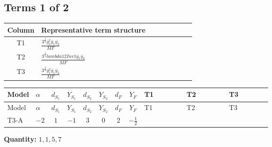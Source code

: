 \documentclass[8pt]{article}
\begin{document}
\begin{landscape}
\subsection*{Terms 1 of 2}
\begin{center}
\begin{tabular}{@{}c >{\raggedright\arraybackslash}p{0.82\linewidth}@{}}
\toprule
Column & Representative term structure \\
\midrule
T1 & \(\displaystyle \frac{3^{\frac{3}{4}} g_{2}^{2} \overline{y_{1}} \overline{y_{2}}}{MF}\) \\
\midrule
T2 & \(\displaystyle \frac{3^{\frac{3}{4}} lambda12Inv1 \overline{y_{1}} \overline{y_{2}}}{MF}\) \\
\midrule
T3 & \(\displaystyle \frac{3^{\frac{3}{4}} g_{1}^{2} \overline{y_{1}} \overline{y_{2}}}{MF}\) \\
\midrule
\bottomrule
\end{tabular}
\end{center}
\smallskip
\tiny
\begin{longtable}{@{}llcccccc >{\raggedright\arraybackslash}p{0.21\linewidth} >{\raggedright\arraybackslash}p{0.21\linewidth} >{\raggedright\arraybackslash}p{0.21\linewidth}@{}}
\toprule
Model & $\alpha$ & $d_{S_1}$ & $Y_{S_1}$ & $d_{S_2}$ & $Y_{S_2}$ & $d_F$ & $Y_F$ & T1 & T2 & T3 \\
\midrule
\endfirsthead
\toprule
Model & $\alpha$ & $d_{S_1}$ & $Y_{S_1}$ & $d_{S_2}$ & $Y_{S_2}$ & $d_F$ & $Y_F$ & T1 & T2 & T3 \\
\midrule
\endhead
T3-A & $-2$ & $1$ & $-1$ & $3$ & $0$ & $2$ & $-\frac{1}{2}$ & \scriptsize\adjustbox{max width=\linewidth}{$\begin{gathered} - \frac{11 \cdot 3^{\frac{3}{4}} g_{2}^{2} \overline{y_{1}} \overline{y_{2}}}{8 MF}\end{gathered}$} & \scriptsize\adjustbox{max width=\linewidth}{$\begin{gathered} - \frac{3^{\frac{3}{4}} lambda12Inv1 \overline{y_{1}} \overline{y_{2}}}{6 MF}\end{gathered}$} & \scriptsize\adjustbox{max width=\linewidth}{$\begin{gathered} - \frac{3^{\frac{3}{4}} g_{1}^{2} \overline{y_{1}} \overline{y_{2}}}{8 MF}\end{gathered}$} \\
\midrule
\bottomrule
\end{longtable}
\clearpage
\noindent\textbf{Quantity: }$\mathrm{1,1,5,7}$\par\smallskip

\end{landscape}
\end{document}
